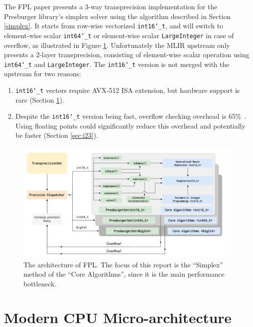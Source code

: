 \documentclass[logo,bsc,singlespacing,parskip]{infthesis}
\newcommand{\dtshort}{\texttt{int16\char`_t}}
\newcommand{\dtlong}{\texttt{int64\char`_t}}
\newenvironment{compactlist}
{ \begin{enumerate}
    \setlength{\itemsep}{0pt}
    \setlength{\parskip}{0pt}
    \setlength{\parsep}{0pt}     
}
{ \end{enumerate} }
\begin{document}
The FPL paper presents a 3-way transprecision implementation for the Presburger
library's simplex solver using the algorithm described in Section \ref{simplex}.
It starts from row-wise vectorized \dtshort{}, and will switch to  element-wise
scalar \dtlong{} or element-wise scalar \texttt{LargeInteger} in case of
overflow, as illustrated in Figure \ref{fig:fpl_arch}. Unfortunately the
MLIR upstream only presents a 2-layer transprecision, consisting of element-wise
scalar operation using \dtlong{} and \texttt{LargeInteger}. The \dtshort{}
version is not merged with the upstream for two reasons: 
\begin{compactlist} 
    \item \dtshort{} vectors require AVX-512 ISA extension, but hardware
    support is rare (Section \ref{sec:avx512}). 
    \item Despite the \dtshort{} version being fast, overflow checking overhead
    is 65\%~\cite{FPL2}. Using floating points could significantly reduce this
    overhead and potentially be faster (Section \ref{sec:i23}).  
\end{compactlist}


\begin{figure}
    \begin{center}
    \includegraphics[width=\linewidth]{image/transprecision.png}
    \caption{The architecture of FPL. The focus of this report is the
    ``Simplex'' method of the ``Core Algorithms'', since it is the main
    performance bottleneck.~\cite{FPL2}}
    \label{fig:fpl_arch}
    \end{center}
\end{figure}

\section{Modern CPU Micro-architecture}
\label{sec:avx512}
\end{document}
